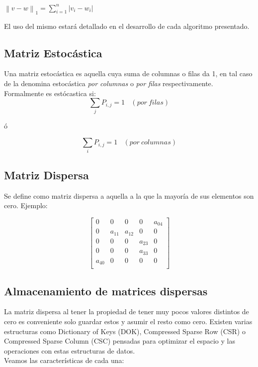 \begin{center}
$\left \| v - w \right \|_{1} = \sum_{i=1}^{n} \left | v_{i} - w_{i} \right |$
\end{center}

El uso del mismo estará detallado en el desarrollo de cada algoritmo presentado.

\subsection{Matriz Estocástica}
	Una matriz estocástica es aquella cuya suma de columnas o filas da 1, en tal caso de la denomina estocástica \textit{por columnas} o \textit{por filas} respectivamente.
	Formalmente es estócastica si:
	\begin{equation}
	\sum_j P_{i,j}=1 \ \ \ \ (por\ filas)
	\end{equation}
	\begin{center}ó\end{center}
		\begin{equation}
	 \sum_i P_{i,j}=1 \ \ \ \ (por\ columnas)
	\end{equation}
	

\subsection{Matriz Dispersa}
   Se define como matriz dispersa a aquella a la que la mayoría de sus elementos son cero.
   Ejemplo:

   $$ 
\begin{bmatrix}
       0    &      0    &   0       &   0           &   a_{04}    \\
       0    &   a_{11}  &   a_{12}  &   0           &   0    \\
       0    &      0    &   0       &   a_{23}      &   0    \\
       0    &      0    &   0       &   a_{33}      &   0    \\
  a_{40}    &      0    &   0       &   0           &   0    \\
\end{bmatrix} 
$$


\subsection{Almacenamiento de matrices dispersas}
 
 La matriz dispersa al tener la propiedad de tener muy pocos valores distintos de cero es conveniente solo guardar estos y asumir el resto como cero. Existen varias estructuras como Dictionary of Keys (DOK), Compressed Sparse Row (CSR) o Compressed Sparse Column (CSC) pensadas para optimizar el espacio y las operaciones con estas estructuras de datos.\\
 Veamos las características de cada una: 


